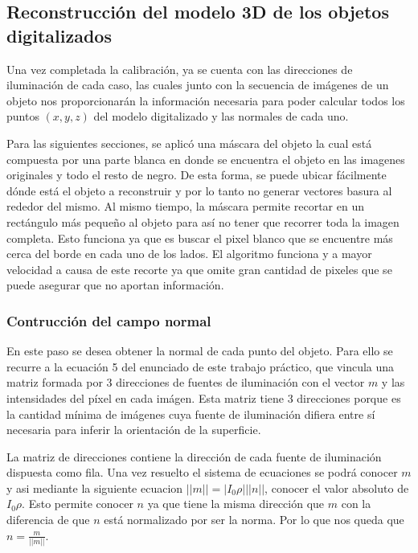 \subsection{Reconstrucción del modelo 3D de los objetos digitalizados}

Una vez completada la calibración, ya se cuenta con las direcciones de
iluminación de cada caso, las cuales junto con la secuencia de imágenes de un
objeto nos proporcionarán la información necesaria para poder calcular todos
los puntos $(x,y,z)$ del modelo digitalizado y las normales de cada uno.

Para las siguientes secciones, se aplicó una máscara del objeto la cual está compuesta por una parte blanca en donde se encuentra el objeto en las imagenes originales y todo el resto de negro. De esta forma, se puede ubicar fácilmente dónde está el objeto a reconstruir y por lo tanto no generar vectores basura al rededor del mismo. Al mismo tiempo, la máscara permite recortar en un rectángulo más pequeño al objeto para así no tener que recorrer toda la imagen completa. Esto funciona ya que es buscar el pixel blanco que se encuentre más cerca del borde en cada uno de los lados. El algoritmo funciona y a mayor velocidad a causa de este recorte ya que omite gran cantidad de pixeles que se puede asegurar que no aportan información.

\subsubsection{Contrucción del campo normal}

En este paso se desea obtener la normal de cada punto del objeto. Para ello
se recurre a la ecuación 5 del enunciado de este trabajo práctico, que
vincula una matriz formada por 3 direcciones de fuentes de iluminación con el
vector $m$ y las intensidades del píxel en cada imágen. Esta matriz tiene 3
direcciones porque es la cantidad mínima de imágenes cuya fuente de
iluminación difiera entre sí necesaria para inferir la orientación de la
superficie.

La matriz de direcciones contiene la dirección de cada fuente de iluminación
dispuesta como fila. Una vez resuelto el sistema de ecuaciones se podrá
conocer $m$ y asi mediante la siguiente ecuacion $||m|| = |I_0\rho| ||n||$,
conocer el valor absoluto de $I_0\rho$. Esto permite conocer $n$ ya que tiene
la misma dirección que $m$ con la diferencia de que $n$ está normalizado
por ser la norma. Por lo que nos queda que $n = \frac{m}{||m||}$.

